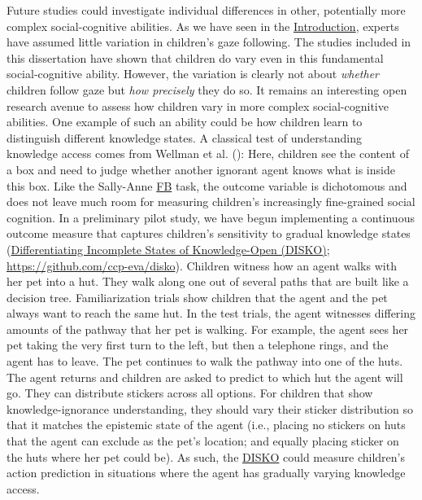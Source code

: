 \documentclass[
]{scrbook}
\begin{document}
Future studies could investigate individual differences in other, potentially more complex social-cognitive abilities. As we have seen in the \hyperref[introduction]{Introduction}, experts have assumed little variation in children's gaze following. The studies included in this dissertation have shown that children do vary even in this fundamental social-cognitive ability. However, the variation is clearly not about \emph{whether} children follow gaze but \emph{how precisely} they do so. It remains an interesting open research avenue to assess how children vary in more complex social-cognitive abilities. One example of such an ability could be how children learn to distinguish different knowledge states. A classical test of understanding knowledge access comes from Wellman et al. (): Here, children see the content of a box and need to judge whether another ignorant agent knows what is inside this box. Like the Sally-Anne \hyperref[acronyms_FB]{FB} task, the outcome variable is dichotomous and does not leave much room for measuring children's increasingly fine-grained social cognition. In a preliminary pilot study, we have begun implementing a continuous outcome measure that captures children's sensitivity to gradual knowledge states (\hyperref[acronyms_DISKO]{Differentiating Incomplete States of Knowledge-Open (DISKO)}; \mbox{\url{https://github.com/ccp-eva/disko}}). Children witness how an agent walks with her pet into a hut. They walk along one out of several paths that are built like a decision tree. Familiarization trials show children that the agent and the pet always want to reach the same hut. In the test trials, the agent witnesses differing amounts of the pathway that her pet is walking. For example, the agent sees her pet taking the very first turn to the left, but then a telephone rings, and the agent has to leave. The pet continues to walk the pathway into one of the huts. The agent returns and children are asked to predict to which hut the agent will go. They can distribute stickers across all options. For children that show knowledge-ignorance understanding, they should vary their sticker distribution so that it matches the epistemic state of the agent (i.e., placing no stickers on huts that the agent can exclude as the pet's location; and equally placing sticker on the huts where her pet could be). As such, the \hyperref[acronyms_DISKO]{DISKO} could measure children's action prediction in situations where the agent has gradually varying knowledge access.
\end{document}
